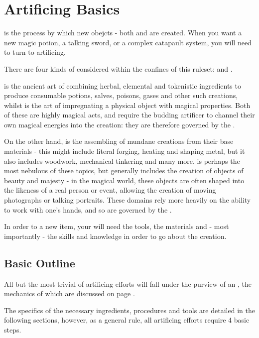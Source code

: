 \chapter{Artificing Basics} \label{S:ArtificingBasic}

 is the process by which new obejcts - both  and  are created. When you want a new magic potion, a talking sword, or a complex catapault system, you will need to turn to artificing. 

There are four kinds of  considered within the confines of this ruleset:  and . 

 is the ancient art of combining herbal, elemental and tokenistic ingredients to produce consumable potions, salves, poisons, gases and other such creations, whilst  is the art of impregnating a physical object with magical properties. Both of these are highly magical acts, and require the budding artificer to channel their own magical energies into the creation: they are therefore governed by the  . 

On the other hand,  is the assembling of mundane creations from their base materials - this might include literal forging, heating and shaping metal, but it also includes woodwork, mechanical tinkering and many more.  is perhaps the most nebulous of these topics, but generally includes the creation of objects of beauty and majesty - in the magical world, these objects are often shaped into the likeness of a real person or event, allowing the creation of moving photographs or talking portraits. These domains rely more heavily on the ability to work with one's hands, and so are governed by the  . 


In order to  a new item, your  will need the tools, the materials and - most importantly - the skills and knowledge in order to go about the creation. 

\section{Basic Outline}

All but the most trivial of artificing efforts will fall under the purview of an , the mechanics of which are discussed on page \pageref{S:Extended}.

The specifics of the necessary ingredients, procedures and tools are detailed in the following sections, however, as a general rule, all artificing efforts require 4 basic steps.

